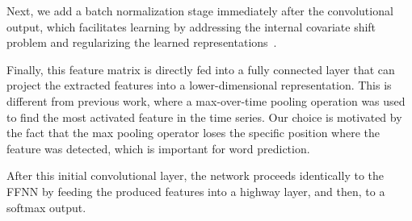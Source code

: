 %
Next, we add a batch normalization stage immediately after the convolutional output, which facilitates learning by addressing the internal covariate shift problem and regularizing the learned representations~\cite{DBLP:journals/corr/IoffeS15}. 





Finally, this feature matrix is directly fed into a fully connected
layer that can project the extracted features into a lower-dimensional
representation. This is different from previous work, where a
max-over-time pooling operation was used to find the most activated
feature in the time series. Our choice is motivated by the fact that
the max pooling operator loses the specific position
where the feature was detected, which is important for word prediction.

After this initial convolutional layer, the network proceeds identically to the FFNN by feeding the produced features into a highway layer, and then, to a softmax output.

